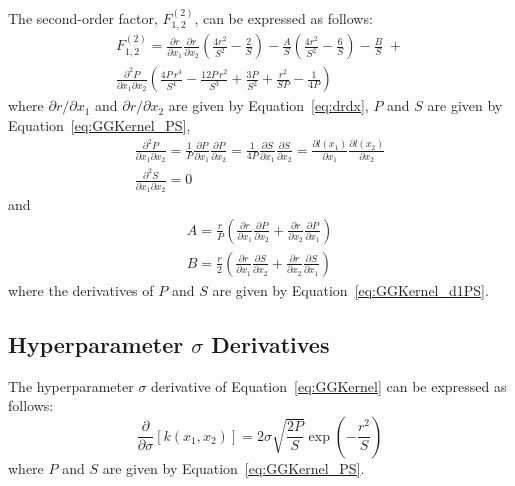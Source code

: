 \documentclass{article}
\begin{document}
The second-order factor, $F^{\left(2\right)}_{1,2}$, can be expressed as follows:
\begin{multline}
\label{eq:GGKernel_F2}
	F^{\left(2\right)}_{1,2} = \frac{\partial r}{\partial x_1} \frac{\partial r}{\partial x_2} \left(\frac{4r^2}{S^2} - \frac{2}{S}\right) - \frac{A}{S} \left(\frac{4r^2}{S^2} - \frac{6}{S}\right) - \frac{B}{S} \; + \\
	\frac{\partial^2 P}{\partial x_1 \partial x_2} \left(\frac{4P \, r^4}{S^4} - \frac{12P \, r^2}{S^3} + \frac{3P}{S^2} + \frac{r^2}{SP} - \frac{1}{4P}\right)
\end{multline}
where $\partial r/\partial x_1$ and $\partial r/\partial x_2$ are given by Equation~\eqref{eq:drdx}, $P$ and $S$ are given by Equation~\eqref{eq:GGKernel_PS},
\begin{equation}
\label{eq:GGKernel_d2PS}
	\begin{gathered}
	\frac{\partial^2 P}{\partial x_1 \partial x_2} = \frac{1}{P} \frac{\partial P}{\partial x_1} \frac{\partial P}{\partial x_2} = \frac{1}{4P} \frac{\partial S}{\partial x_1} \frac{\partial S}{\partial x_2} = \frac{\partial l\!\left(x_1\right)}{\partial x_1} \frac{\partial l\!\left(x_2\right)}{\partial x_2} \\
	\frac{\partial^2 S}{\partial x_1 \partial x_2} = 0
	\end{gathered}
\end{equation}
and
\begin{equation}
\label{eq:GGKernel_extras}
	\begin{gathered}
	A = \frac{r}{P} \left(\frac{\partial r}{\partial x_1} \frac{\partial P}{\partial x_2} + \frac{\partial r}{\partial x_2} \frac{\partial P}{\partial x_1}\right) \\
	B = \frac{r}{2} \left(\frac{\partial r}{\partial x_1} \frac{\partial S}{\partial x_2} + \frac{\partial r}{\partial x_2} \frac{\partial S}{\partial x_1}\right)
	\end{gathered}
\end{equation}
where the derivatives of $P$ and $S$ are given by Equation~\eqref{eq:GGKernel_d1PS}.

\subsection{Hyperparameter $\sigma$ Derivatives}
\label{subsec:GGHypDer_s}

The hyperparameter $\sigma$ derivative of Equation~\eqref{eq:GGKernel} can be expressed as follows:
\begin{equation}
\label{eq:GGKernel_ds}
	\frac{\partial}{\partial \sigma} \left[k\!\left(x_1,x_2\right)\right] = 2 \sigma \sqrt{\frac{2P}{S}} \exp{\left(-\frac{r^2}{S}\right)}
\end{equation}
where $P$ and $S$ are given by Equation~\eqref{eq:GGKernel_PS}.
\end{document}
